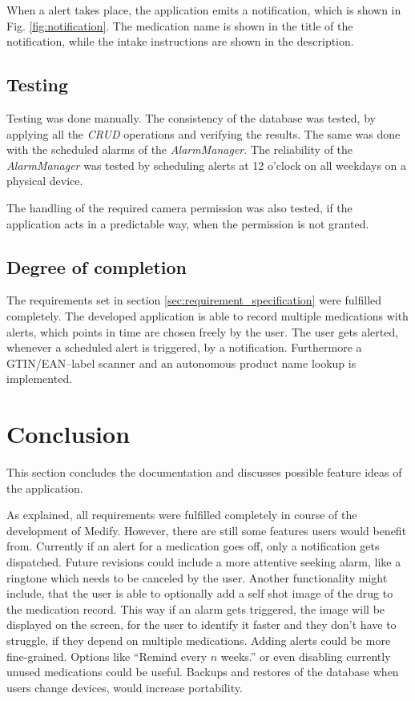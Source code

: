 \documentclass[conference]{IEEEtran}
\begin{document}
When a alert takes place, the application emits a notification, which is shown in Fig. \ref{fig:notification}.
The medication name is shown in the title of the notification, while the intake instructions are shown in the 
description.

\subsection{Testing}
Testing was done manually. The consistency of the database was tested, by applying all the \textit{CRUD} operations
and verifying the results. The same was done with the scheduled alarms of the \textit{AlarmManager}. The reliability
of the \textit{AlarmManager} was tested by scheduling alerts at 12 o'clock on all weekdays on a physical device.

The handling of the required camera permission was also tested, if the application acts in a predictable way, when
the permission is not granted.

\subsection{Degree of completion}
The requirements set in section \ref{sec:requirement_specification} were fulfilled completely. The developed 
application is able to record multiple medications with alerts, which points in time are chosen freely by the user.
The user gets alerted, whenever a scheduled alert is triggered, by a notification. Furthermore a GTIN/EAN--label
scanner and an autonomous product name lookup is implemented.

\section{Conclusion}
This section concludes the documentation and discusses possible feature ideas of the application.

As explained, all requirements were fulfilled completely in course of the development of Medify. However, there are
still some features users would benefit from. Currently if an alert for a medication goes off, only a notification
gets dispatched. Future revisions could include a more attentive seeking alarm, like a ringtone which needs to be
canceled by the user. Another functionality might include, that the user is able to optionally add a self shot
image of the drug to the medication record. This way if an alarm gets triggered, the image will be displayed
on the screen, for the user to identify it faster and they don't have to struggle, if they depend on multiple
medications. Adding alerts could be more fine-grained. Options like ``Remind every $n$ weeks.'' or even disabling
currently unused medications could be useful. Backups and restores of the database when users change devices, would
increase portability.
\end{document}
